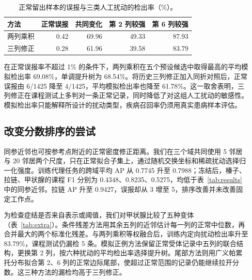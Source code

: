 \documentclass[sigconf,nonacm,screen]{acmart}
\begin{document}
\begin{table}[ht]\centering\caption{正常留出样本的误报与三类人工扰动的检出率（\%）。}\label{tab:stress}
\setlength{\tabcolsep}{4pt}
\begin{tabular}{lrrrr}\toprule
方法&正常误报&共同变化&第 2 列较强&第 6 列较强\\\midrule
两列乘积&0.42&69.96&49.33&87.93\\
三列修正&0.28&61.96&39.58&83.79\\\bottomrule
\end{tabular}\end{table}

在正常误报率不超过 1\% 的条件下，两列乘积在五个预设候选中取得最高的平均模拟检出率 69.08\%，单调提升树为 68.54\%。将历史三列修正加入同折对照后，正常误报由 6/1425 降至 4/1425，平均模拟检出率也降至 61.78\%。这一取舍表明，三列修正在课程测试上多判对一条正常记录，同时降低了对这组人工扰动的敏感性。模拟检出率只能解释所设计的扰动类型，疾病召回率仍须用真实患病样本评估。

\balance
\subsection{改变分数排序的尝试}
同参近邻也可按参考点附近的正常密度修正距离。我们在三个域共同使用 5 邻居与 20 邻居两个尺度，只在正常拟合子集上，通过随机交换坐标和稀疏扰动选择归一化强度。训练代理任务的跨域平均 AP 从 0.7745 升至 0.7988；冻结后，榛子、拉链、甲状腺的课程 F1 分别为 0.4348、0.8235、0.5275，均低于表~\ref{tab:results}中的同参近邻。拉链 AP 升至 0.9427，误报却从 3 增至 5，排序改善并未改善固定工作点。

\par\smallskip\noindent\begin{minipage}{\columnwidth}\centering
{}\label{tab:extra}
\setlength{\tabcolsep}{2.5pt}
\end{minipage}\par\smallskip

为检查症结是否来自表示或阈值，我们对甲状腺比较了五种变体（表~\ref{tab:extra}）。条件残差方法用其余五列的近邻估计每一列的正常中位数，再合并最大的两个标准化残差。与两列乘积等权融合后，训练内定向扰动检出率升至 83.79\%，课程测试仍漏检 5 条。模拟正例方法保留正常受体记录中五列的联合结构，更换第 2 列，按六种扰动的平均检出率选择提升树。尾部方法则用广义帕累托分布拟合第 2、6 列的正常边际尾部，使超过正常范围的记录仍能继续拉开分数。这三种方法的漏检均高于三列修正。
\end{document}
